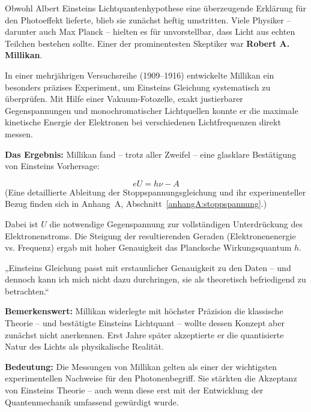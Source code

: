 Obwohl Albert Einsteins Lichtquantenhypothese eine überzeugende Erklärung für den Photoeffekt lieferte, blieb sie zunächst heftig umstritten. Viele Physiker – darunter auch Max Planck – hielten es für unvorstellbar, dass Licht aus echten Teilchen bestehen sollte. Einer der prominentesten Skeptiker war \textbf{Robert A. Millikan}.

In einer mehrjährigen Versuchsreihe (1909–1916) entwickelte Millikan ein besonders präzises Experiment, um Einsteins Gleichung systematisch zu überprüfen. Mit Hilfe einer Vakuum-Fotozelle, exakt justierbarer Gegenspannungen und monochromatischer Lichtquellen konnte er die maximale kinetische Energie der Elektronen bei verschiedenen Lichtfrequenzen direkt messen.

\textbf{Das Ergebnis:} Millikan fand – trotz aller Zweifel – eine glasklare Bestätigung von Einsteins Vorhersage:

\[
e U = h \nu - A
\]
(Eine detaillierte Ableitung der Stoppspannungsgleichung und ihr experimenteller Bezug finden sich in Anhang~A, Abschnitt~\ref{anhangA:stoppspannung}.)

Dabei ist \( U \) die notwendige Gegenspannung zur vollständigen Unterdrückung des Elektronenstroms. Die Steigung der resultierenden Geraden (Elektronenenergie vs. Frequenz) ergab mit hoher Genauigkeit das Plancksche Wirkungsquantum \( h \).

\vspace{1em}
\begin{tcolorbox}[physikbox, title=Robert A. Millikan (1916)\textit{ \cite{millikan1916}} ]
	\label{box:einsteins gleichung passt}
	\small
	„Einsteins Gleichung passt mit erstaunlicher Genauigkeit zu den Daten – und dennoch kann ich mich nicht dazu durchringen, sie als theoretisch befriedigend zu betrachten.“
\end{tcolorbox}
\vspace{1em}
\textbf{Bemerkenswert:} Millikan widerlegte mit höchster Präzision die klassische Theorie – und bestätigte Einsteins Lichtquant – wollte dessen Konzept aber zunächst nicht anerkennen. Erst Jahre später akzeptierte er die quantisierte Natur des Lichts als physikalische Realität.

\textbf{Bedeutung:} Die Messungen von Millikan gelten als einer der wichtigsten experimentellen Nachweise für den Photonenbegriff. Sie stärkten die Akzeptanz von Einsteins Theorie – auch wenn diese erst mit der Entwicklung der Quantenmechanik umfassend gewürdigt wurde.

